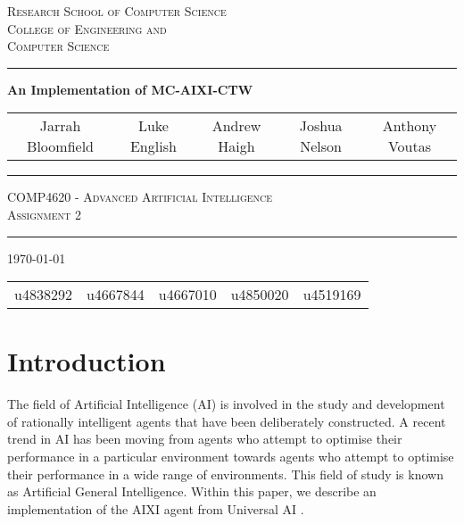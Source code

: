 \documentclass[pdftex,twoside,a4paper]{report}
\begin{document}
\begin{titlepage}
\renewcommand*{\thefootnote}{\fnsymbol{footnote}}
\begin{center}

\textsc{\Large Research School of Computer Science}\\[0.5cm]
\textsc{\Large College of Engineering and}\\[0.2cm]
\textsc{\Large Computer Science}\\[0.5cm]
\vspace{1.4cm}
\hrule
\vspace{1.4cm}
{\huge \bfseries An Implementation of MC-AIXI-CTW} \\
\vspace{0.4cm}


\begin{tabular}{ccccc}
  Jarrah Bloomfield\footnotemark &
  Luke English\footnotemark &
  Andrew Haigh\footnotemark &
  Joshua Nelson\footnotemark &
  Anthony Voutas\footnotemark
\end{tabular}

\vspace{1.4cm}
\hrule
\vspace{1.0cm}
\textsc{\large COMP4620 - Advanced Artificial Intelligence}\\
\textsc{Assignment 2}\\
\vspace{1.0cm}
\hrule
\vspace{1.4cm}
\vfill
{\large \today} \\[0.5cm]

\begin{tabular}{ccccc}
  \setcounter{footnote}{0}
  u4838292\footnotemark &
  u4667844\footnotemark &
  u4667010\footnotemark &
  u4850020\footnotemark &
  u4519169\footnotemark
\end{tabular}
\end{center}
 
\end{titlepage}

\tableofcontents

\newpage

\chapter{Introduction}

The field of Artificial Intelligence (AI) is involved in the study and
development of rationally intelligent agents that have been deliberately
constructed. A recent trend in AI has been moving from agents who attempt to
optimise their performance in a particular environment towards agents who
attempt to optimise their performance in a wide range of environments. This
field of study is known as Artificial General Intelligence. Within this paper,
we describe an implementation of the AIXI agent from Universal AI
\citep{hutter2005}.
\end{document}
